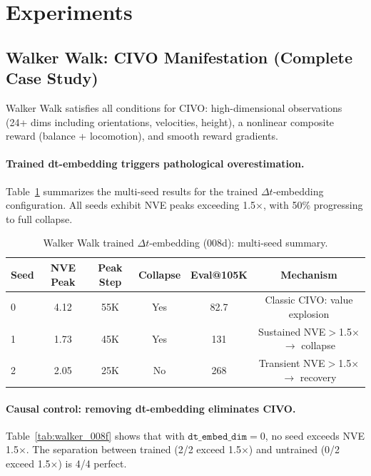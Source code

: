 \documentclass[letterpaper]{article}
\begin{document}
\section{Experiments}

\subsection{Walker Walk: CIVO Manifestation (Complete Case Study)}

Walker Walk satisfies all conditions for CIVO: high-dimensional observations (24+ dims including orientations, velocities, height), a nonlinear composite reward (balance + locomotion), and smooth reward gradients.

\paragraph{Trained dt-embedding triggers pathological overestimation.}

Table~\ref{tab:walker_008d} summarizes the multi-seed results for the trained $\Delta t$-embedding configuration. All seeds exhibit NVE peaks exceeding 1.5$\times$, with 50\% progressing to full collapse.

\begin{table}[h]
\centering
\caption{Walker Walk trained $\Delta t$-embedding (008d): multi-seed summary.}
\label{tab:walker_008d}
\begin{tabular}{lccccc}
\toprule
Seed & NVE Peak & Peak Step & Collapse & Eval@105K & Mechanism \\
\midrule
0 & 4.12 & 55K & Yes & 82.7 & Classic CIVO: value explosion \\
1 & 1.73 & 45K & Yes & 131 & Sustained NVE$>$1.5$\times$ $\to$ collapse \\
2 & 2.05 & 25K & No & 268 & Transient NVE$>$1.5$\times$ $\to$ recovery \\
\bottomrule
\end{tabular}
\end{table}

\paragraph{Causal control: removing dt-embedding eliminates CIVO.}

Table~\ref{tab:walker_008f} shows that with $\texttt{dt\_embed\_dim}=0$, no seed exceeds NVE 1.5$\times$. The separation between trained (2/2 exceed 1.5$\times$) and untrained (0/2 exceed 1.5$\times$) is 4/4 perfect.
\end{document}
